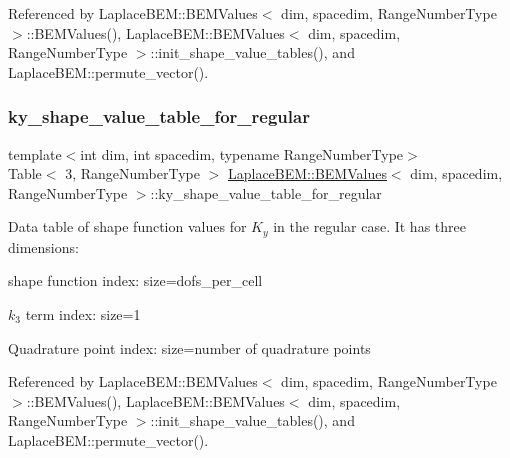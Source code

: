 Referenced by Laplace\+B\+E\+M\+::\+B\+E\+M\+Values$<$ dim, spacedim, Range\+Number\+Type $>$\+::\+B\+E\+M\+Values(), Laplace\+B\+E\+M\+::\+B\+E\+M\+Values$<$ dim, spacedim, Range\+Number\+Type $>$\+::init\+\_\+shape\+\_\+value\+\_\+tables(), and Laplace\+B\+E\+M\+::permute\+\_\+vector().

\mbox{\label{classLaplaceBEM_1_1BEMValues_ac627ae572f0006b87b0b3a48d9fefb12}} 
\subsubsection{\texorpdfstring{ky\+\_\+shape\+\_\+value\+\_\+table\+\_\+for\+\_\+regular}{ky\_shape\_value\_table\_for\_regular}}
{\footnotesize\ttfamily template$<$int dim, int spacedim, typename Range\+Number\+Type$>$ \\
Table$<$ 3, Range\+Number\+Type $>$ \hyperlink{classLaplaceBEM_1_1BEMValues}{Laplace\+B\+E\+M\+::\+B\+E\+M\+Values}$<$ dim, spacedim, Range\+Number\+Type $>$\+::ky\+\_\+shape\+\_\+value\+\_\+table\+\_\+for\+\_\+regular}

Data table of shape function values for $K_y$ in the regular case. It has three dimensions\+:
\begin{DoxyEnumerate}
\item shape function index\+: size={\ttfamily dofs\+\_\+per\+\_\+cell} 
\item $k_3$ term index\+: size=1
\item Quadrature point index\+: size=number of quadrature points 
\end{DoxyEnumerate}

Referenced by Laplace\+B\+E\+M\+::\+B\+E\+M\+Values$<$ dim, spacedim, Range\+Number\+Type $>$\+::\+B\+E\+M\+Values(), Laplace\+B\+E\+M\+::\+B\+E\+M\+Values$<$ dim, spacedim, Range\+Number\+Type $>$\+::init\+\_\+shape\+\_\+value\+\_\+tables(), and Laplace\+B\+E\+M\+::permute\+\_\+vector().

\mbox{\label{classLaplaceBEM_1_1BEMValues_a10f53c8eacb5d445c5289ca6b7ca3bfe}} 
